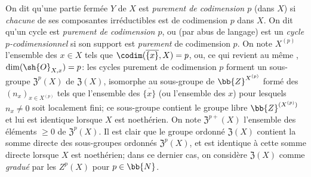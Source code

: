 \begin{env}[21.6.2]
On dit qu'une partie fermée $Y$ de $X$ est \emph{purement de codimension $p$} (dans $X$) si \emph{chacune} de ses composantes irréductibles est de codimension $p$ dans $X$.
On dit qu'un cycle est \emph{purement de codimension $p$}, ou (par abus de langage) est un \emph{cycle $p$-codimensionnel} si son support est \emph{purement} de codimension $p$.
On note $X^{(p)}$ l'ensemble des $x\in X$ tels que $\codim(\overline{\{x\}},X)=p$, ou, ce qui revient au même , $\dim(\sh{O}_{X,x})=p$:
les cycles purement de codimension $p$ forment un sous-groupe $\mathfrak{Z}^p(X)$ de $\mathfrak{Z}(X)$, isomorphe au sous-groupe de $\bb{Z}^{X^{(p)}}$ formé des $(n_x)_{x\in X^{(p)}}$ tels que l'ensemble des $\overline{\{x\}}$ (ou l'ensemble des $x$) pour lesquels $n_x\neq0$ soit localement fini;
ce sous-groupe contient le groupe libre $\bb{Z}^{(X^{(p)})}$ et lui est identique lorsque $X$ est noethérien.
On note $\mathfrak{Z}^{p+}(X)$ l'ensemble des éléments $\geq0$ de $\mathfrak{Z}^p(X)$.
Il est clair que le groupe ordonné $\mathfrak{Z}(X)$ contient la somme directe des sous-groupes ordonnés $\mathfrak{Z}^p(X)$, et est identique à cette somme directe lorsque $X$ est noethérien;
dans ce dernier cas, on considère $\mathfrak{Z}(X)$ comme \emph{gradué} par les $Z^p(X)$ pour $p\in\bb{N}$.
\end{env}

